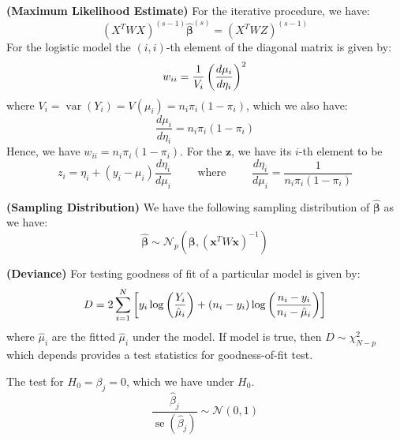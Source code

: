 \begin{remark}{\textbf{(Maximum Likelihood Estimate)}}
    For the iterative procedure, we have:
    \begin{equation*}
        (X^TWX)^{(s-1)}\hat{\boldsymbol \beta}^{(s)} = (X^TWZ)^{(s-1)}
    \end{equation*}
    For the logistic model the $(i,i)$-th element of the diagonal matrix is given by:
    \begin{equation*}
        w_{ii} = \frac{1}{V_i}\left( \frac{d\mu_i}{d\eta_i} \right)^2
    \end{equation*}
    where $V_i = \operatorname{var}(Y_i) = V(\mu_i) = n_i\pi_i(1-\pi_i)$, which we also have:
    \begin{equation*}
        \frac{d\mu_i}{d\eta_i} = n_i\pi_i(1-\pi_i)
    \end{equation*}
    Hence, we have $w_{ii} = n_i\pi_i(1-\pi_i)$. For the $\boldsymbol z$, we have its $i$-th element to be 
    \begin{equation*}
        z_i = \eta_i + (y_i - \mu_i)\frac{d\eta_i}{d\mu_i} \qquad \text{ where } \qquad \frac{d\eta_i}{d\mu_i} = \frac{1}{n_i\pi_i(1-\pi_i)}
    \end{equation*}
\end{remark}

\begin{remark}{\textbf{(Sampling Distribution)}}
    We have the following sampling distribution of $\hat{\boldsymbol \beta}$ as we have:
    \begin{equation*}
        \hat{\boldsymbol \beta} \sim\mathcal{N}_p(\boldsymbol \beta, (\boldsymbol x^TW\boldsymbol x)^{-1})
    \end{equation*}
\end{remark}

\begin{remark}{\textbf{(Deviance)}}
    For testing goodness of fit of a particular model is given by:
    \begin{equation*}
        D = 2\sum^N_{i=1}\left[ y_i\log\left( \frac{Y_i}{\hat{\mu}_i} \right) + (n_i-y_i)\log\left( \frac{n_i-y_i}{n_i-\hat{\mu}_i} \right)  \right]
    \end{equation*}
    where $\hat{\mu}_i$ are the fitted $\hat{\mu}_i$ under the model. If model is true, then $D\sim\chi^2_{N-p}$ which depends provides a test statistics for goodness-of-fit test. 
\end{remark}

\begin{remark}
    The test for $H_0 = \beta_j = 0$, which we have under $H_0$. 
    \begin{equation*}
        \frac{\hat{\beta}_j}{\operatorname{se}(\hat{\beta}_j)} \sim \mathcal{N}(0, 1)
    \end{equation*}
\end{remark}

